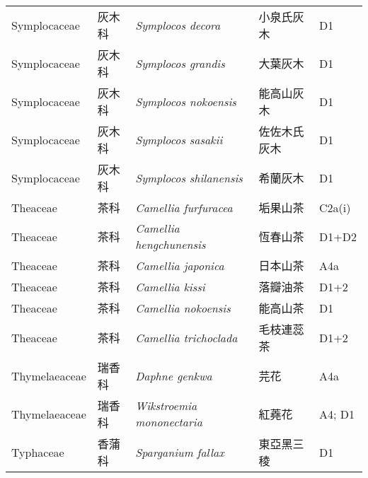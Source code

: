 {\begin{longtable}{p{2.5cm}p{2.5cm}p{4.5cm}p{2.5cm}p{3cm}}
    Symplocaceae & 灰木科 & \textit{Symplocos decora}  & 小泉氏灰木 & D1 \index{Symplocos@\textit{Symplocos}!decora@\textit{decora}}  \index{小泉氏灰木} \\
    Symplocaceae & 灰木科 & \textit{Symplocos grandis}  & 大葉灰木 & D1 \index{Symplocos@\textit{Symplocos}!grandis@\textit{grandis}}  \index{大葉灰木} \\
    Symplocaceae & 灰木科 & \textit{Symplocos nokoensis}  & 能高山灰木 & D1 \index{Symplocos@\textit{Symplocos}!nokoensis@\textit{nokoensis}}  \index{能高山灰木} \\
    Symplocaceae & 灰木科 & \textit{Symplocos sasakii}  & 佐佐木氏灰木 & D1 \index{Symplocos@\textit{Symplocos}!sasakii@\textit{sasakii}}  \index{佐佐木氏灰木} \\
    Symplocaceae & 灰木科 & \textit{Symplocos shilanensis}  & 希蘭灰木 & D1 \index{Symplocos@\textit{Symplocos}!shilanensis@\textit{shilanensis}}  \index{希蘭灰木} \\
    Theaceae & 茶科 & \textit{Camellia furfuracea}  & 垢果山茶 & C2a(i) \index{Camellia@\textit{Camellia}!furfuracea@\textit{furfuracea}}  \index{垢果山茶} \\
    Theaceae & 茶科 & \textit{Camellia hengchunensis}  & 恆春山茶 & D1+D2 \index{Camellia@\textit{Camellia}!hengchunensis@\textit{hengchunensis}}  \index{恆春山茶} \\
    Theaceae & 茶科 & \textit{Camellia japonica}  & 日本山茶 & A4a \index{Camellia@\textit{Camellia}!japonica@\textit{japonica}}  \index{日本山茶} \\
    Theaceae & 茶科 & \textit{Camellia kissi}  & 落瓣油茶 & D1+2 \index{Camellia@\textit{Camellia}!kissi@\textit{kissi}}  \index{落瓣油茶} \\
    Theaceae & 茶科 & \textit{Camellia nokoensis}  & 能高山茶 & D1 \index{Camellia@\textit{Camellia}!nokoensis@\textit{nokoensis}}  \index{能高山茶} \\
    Theaceae & 茶科 & \textit{Camellia trichoclada}  & 毛枝連蕊茶 & D1+2 \index{Camellia@\textit{Camellia}!trichoclada@\textit{trichoclada}}  \index{毛枝連蕊茶} \\
    Thymelaeaceae & 瑞香科 & \textit{Daphne genkwa}  & 芫花 & A4a \index{Daphne@\textit{Daphne}!genkwa@\textit{genkwa}}  \index{芫花} \\
    Thymelaeaceae & 瑞香科 & \textit{Wikstroemia mononectaria}  & 紅蕘花 & A4; D1 \index{Wikstroemia@\textit{Wikstroemia}!mononectaria@\textit{mononectaria}}  \index{紅蕘花} \\
    Typhaceae & 香蒲科 & \textit{Sparganium fallax}  & 東亞黑三稜 & D1 \index{Sparganium@\textit{Sparganium}!fallax@\textit{fallax}}  \index{東亞黑三稜} \\

\end{longtable}}
